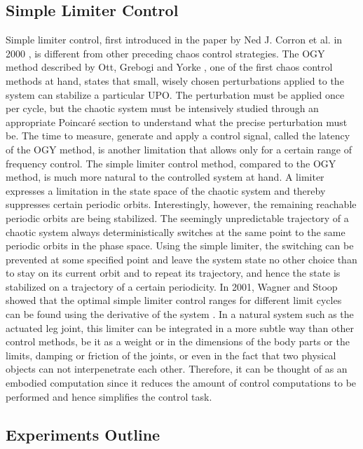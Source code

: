 \documentclass[main]{subfiles}
\begin{document}
\subsection{Simple Limiter Control}

Simple limiter control, first introduced in the paper by Ned J. Corron et al. in 2000 \cite{bib:Corron2000}, is different from other preceding chaos control strategies. %
%
The OGY method described by Ott, Grebogi and Yorke \cite{bib:Ott1990}, one of the first chaos control methods at hand, states that small, wisely chosen perturbations applied to the system can stabilize a particular UPO. %
%
The perturbation must be applied once per cycle, but the chaotic system must be intensively studied through an appropriate Poincaré section to understand what the precise perturbation must be. %
%
The time to measure, generate and apply a control signal, called the latency of the OGY method, is another limitation that allows only for a certain range of frequency control. %
%
The simple limiter control method, compared to the OGY method, is much more natural to the controlled system at hand. %
%
A limiter expresses a limitation in the state space of the chaotic system and thereby suppresses certain periodic orbits. %
%
%
Interestingly, however, the remaining reachable periodic orbits are being stabilized. %
%
The seemingly unpredictable trajectory of a chaotic system always deterministically switches at the same point to the same periodic orbits in the phase space. %
%
Using the simple limiter, the switching can be prevented at some specified point and leave the system state no other choice than to stay on its current orbit and to repeat its trajectory, and hence the state is stabilized on a trajectory of a certain periodicity. %
%
In 2001, Wagner and Stoop showed that the optimal simple limiter control ranges for different limit cycles can be found using the derivative of the system \cite{bib:Wagner2001}. %
%
In a natural system such as the actuated leg joint, this limiter can be integrated in a more subtle way than other control methods, be it as a weight or in the dimensions of the body parts or the limits, damping or friction of the joints, or even in the fact that two physical objects can not interpenetrate each other. %
%
Therefore, it can be thought of as an embodied computation since it reduces the amount of control computations to be performed and hence simplifies the control task. %

\subsection{Experiments Outline}
\end{document}
